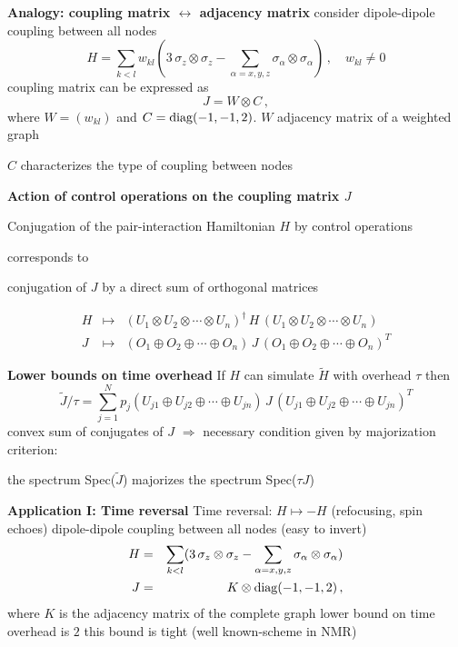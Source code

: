 \documentclass[portrait]{seminar}
\begin{document}
\begin{slide}
{\bf Analogy: coupling matrix $\leftrightarrow$ adjacency matrix}
\vfill
consider dipole-dipole coupling between all nodes
\[
H=\sum_{k<l} w_{kl} (3\,\sigma_z\otimes\sigma_z - \sum_{\alpha=x,y,z} 
\sigma_\alpha\otimes\sigma_\alpha)\,,\quad w_{kl}\neq 0
\]
\vfill
coupling matrix can be expressed as
\[
J=W\otimes C\,,
\]
where $W=(w_{kl})$ and $C={\rm diag}(-1,-1,2)$.
\vfill
$W$ adjacency matrix of a weighted graph

$C$ characterizes the type of coupling between nodes
\vfill
\end{slide}


\begin{slide}
{\large {\bf Action of control operations on the coupling matrix $J$}}
\vfill
\begin{center}
{\blue Conjugation of the pair-interaction Hamiltonian $H$ by control
operations}

corresponds to

{\blue conjugation of $J$ by a direct sum of orthogonal matrices}
\end{center}
\[
\begin{array}{ccc}
H & \mapsto & (U_1\otimes U_2\otimes\cdots\otimes U_n)^\dagger\, H\, 
(U_1\otimes U_2\otimes\cdots\otimes U_n) \\
J & \mapsto & (O_1\oplus O_2\oplus\cdots\oplus O_n)\, J\,
(O_1\oplus O_2\oplus\cdots\oplus O_n)^T
\end{array}
\]
\vfill
\end{slide}

\begin{slide}
{\large {\bf Lower bounds on time overhead}}
\vfill
If $H$ can simulate $\tilde{H}$ with overhead $\tau$ then
\[
\tilde{J}/\tau = \sum_{j=1}^N p_j 
(U_{j1}\oplus U_{j2}\oplus\cdots\oplus U_{jn})
\,J\, (U_{j1}\oplus U_{j2}\oplus\cdots\oplus U_{jn})^T
\]
convex sum of conjugates of $J$
\vfill
$\Rightarrow$ necessary condition given by {\blue majorization criterion}:\\
\begin{center}
the spectrum Spec($\tilde{J}$) majorizes the spectrum Spec($\tau J$)
\end{center}
\vfill
\end{slide}

\begin{slide}
{\large {\bf Application I: Time reversal}}
\vfill
Time reversal: $H \mapsto -H$ (refocusing, spin echoes)
\vfill
dipole-dipole coupling between all nodes (easy to invert)
\begin{eqnarray*}
H & = & \sum_{k<l} (3\,\sigma_z\otimes\sigma_z - \sum_{\alpha=x,y,z} 
\sigma_\alpha\otimes\sigma_\alpha) \\
J & = & K \otimes {\rm diag}(-1,-1,2)\,,
\end{eqnarray*}
where $K$ is the adjacency matrix of the complete graph
\vfill
lower bound on time overhead is $2$
\vfill
this bound is tight (well known-scheme in NMR)
\vfill
\end{slide}
\end{document}
